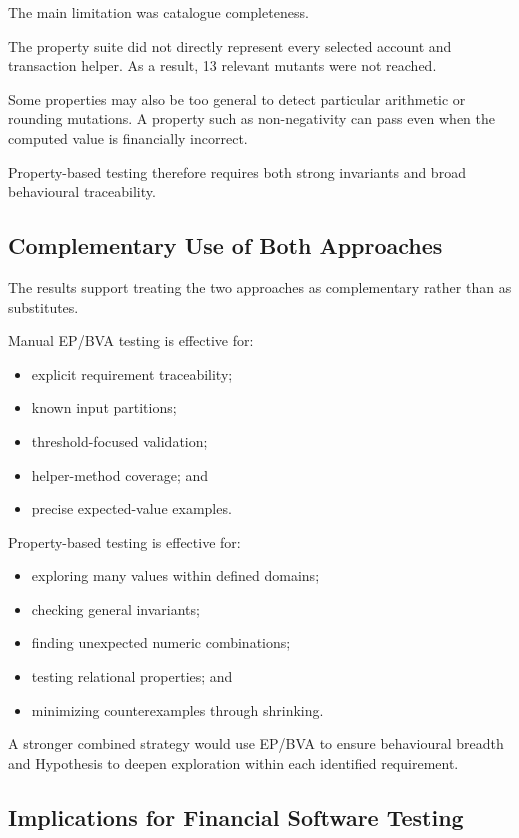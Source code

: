 \documentclass[12pt]{article}
\begin{document}
The main limitation was catalogue completeness.

The property suite did not directly represent every selected account and
transaction helper. As a result, 13 relevant mutants were not reached.

Some properties may also be too general to detect particular arithmetic or
rounding mutations. A property such as non-negativity can pass even when the
computed value is financially incorrect.

Property-based testing therefore requires both strong invariants and broad
behavioural traceability.

\subsection{Complementary Use of Both Approaches}

The results support treating the two approaches as complementary rather than
as substitutes.

Manual EP/BVA testing is effective for:

\begin{itemize}
    \item explicit requirement traceability;
    \item known input partitions;
    \item threshold-focused validation;
    \item helper-method coverage; and
    \item precise expected-value examples.
\end{itemize}

Property-based testing is effective for:

\begin{itemize}
    \item exploring many values within defined domains;
    \item checking general invariants;
    \item finding unexpected numeric combinations;
    \item testing relational properties; and
    \item minimizing counterexamples through shrinking.
\end{itemize}

A stronger combined strategy would use EP/BVA to ensure behavioural breadth
and Hypothesis to deepen exploration within each identified requirement.

\subsection{Implications for Financial Software Testing}
\end{document}
